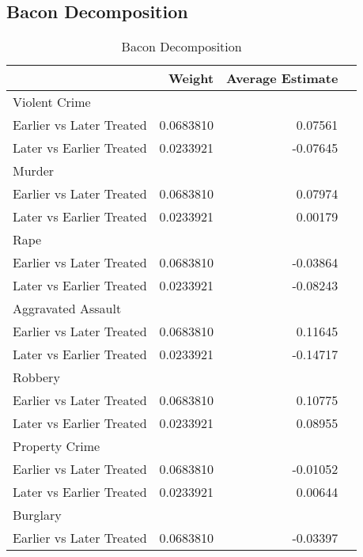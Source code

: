 \documentclass{article}
\begin{document}
\subsection*{Bacon Decomposition}
\begin{table}[h]
\centering
  \caption{Bacon Decomposition} 
  \label{tab:bacon}
\begin{tabular}[t]{lrrl}
\toprule
 & Weight & Average Estimate\\
\midrule
Violent Crime\\
\hspace{3mm}Earlier vs Later Treated & 0.0683810 & 0.07561\\
\hspace{3mm}Later vs Earlier Treated & 0.0233921 & -0.07645\\
\midrule
Murder\\
\hspace{3mm}Earlier vs Later Treated & 0.0683810 & 0.07974\\
\hspace{3mm}Later vs Earlier Treated & 0.0233921 & 0.00179\\
\midrule
Rape\\
\hspace{3mm}Earlier vs Later Treated & 0.0683810 & -0.03864\\
\hspace{3mm}Later vs Earlier Treated & 0.0233921 & -0.08243\\
\midrule
Aggravated Assault\\
\hspace{3mm}Earlier vs Later Treated & 0.0683810 & 0.11645\\
\hspace{3mm}Later vs Earlier Treated & 0.0233921 & -0.14717\\
\midrule
Robbery\\
\hspace{3mm}Earlier vs Later Treated & 0.0683810 & 0.10775\\
\hspace{3mm}Later vs Earlier Treated & 0.0233921 & 0.08955\\
\midrule
Property Crime\\
\hspace{3mm}Earlier vs Later Treated & 0.0683810 & -0.01052\\
\hspace{3mm}Later vs Earlier Treated & 0.0233921 & 0.00644\\
\midrule
Burglary\\
\hspace{3mm}Earlier vs Later Treated & 0.0683810 & -0.03397\\

\end{tabular}
\end{table}
\end{document}

